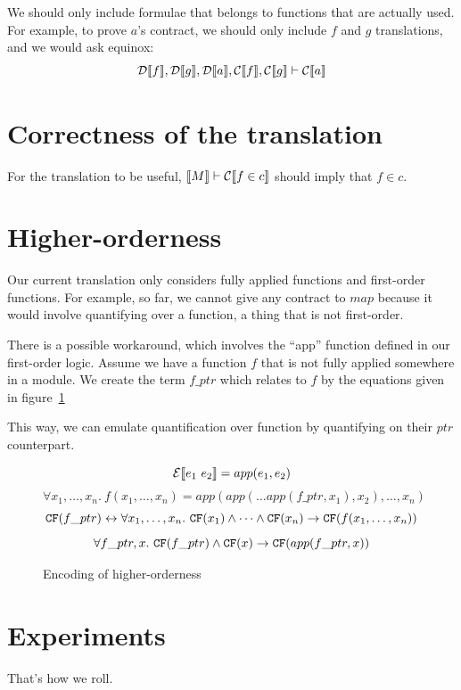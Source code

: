 \documentclass[preprint]{sigplanconf}
\begin{document}
We should only include formulae that belongs to functions that are
actually used. For example, to prove $a$'s contract, we should only
include $f$ and $g$ translations, and we would ask equinox:
$$ \mathcal{D} \llbracket f \rrbracket,\mathcal{D} \llbracket g \rrbracket,\mathcal{D} \llbracket a \rrbracket,\mathcal{C} \llbracket f \rrbracket,\mathcal{C} \llbracket g \rrbracket \vdash
\mathcal{C} \llbracket a \rrbracket$$


\section{Correctness of the translation}
For the translation to be useful, $\llbracket M \rrbracket \vdash \mathcal{C} \llbracket f \in c \rrbracket $
should imply that $f \in c$.


\section{Higher-orderness}
\label{ho}
Our current translation only considers fully applied functions and
first-order functions. For example, so far, we cannot give any
contract to $map$ because it would involve quantifying over a
function, a thing that is not first-order.

There is a possible workaround, which involves the ``app'' function
defined in our first-order logic. Assume we have a function $f$ that
is not fully applied somewhere in a module. We create the term
$f\_ptr$ which relates to $f$ by the equations given in figure~\ref{ho-fig}

This way, we can emulate quantification over function by quantifying
on their $ptr$ counterpart.


\begin{figure}
$$\mathcal{E} \llbracket e_1~e_2 \rrbracket = app(e_1,e_2)$$
$$ \forall x_1,\dots,x_n.~f(x_1,\dots,x_n) = app(app(\dots app(f\_ptr,x_1),x_2),\dots,x_n)$$
$$ \texttt{CF}(f\_ptr) \leftrightarrow \forall x_1,\dots,x_n.~\texttt{CF}(x_1) \land \dots \land \texttt{CF}(x_n) \to \texttt{CF}(f(x_1,\dots,x_n))$$
$$\forall f\_ptr,x.~\texttt{CF}(f\_ptr) \land \texttt{CF}(x) \to \texttt{CF}(app(f\_ptr,x))$$
\caption{Encoding of higher-orderness}
\label{ho-fig}
\end{figure}

\section{Experiments}
That's how we roll.
\end{document}
